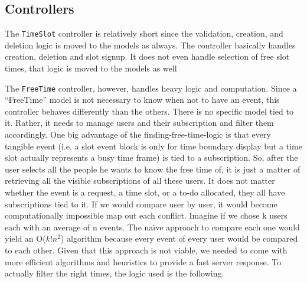 \documentclass[11pt]{article}
\begin{document}
\subsection{Controllers}
The \texttt{TimeSlot} controller is relatively short since the validation, creation, and deletion logic is moved to the models as always. The controller basically handles creation, deletion and slot signup. It does not even handle selection of free slot times, that logic is moved to the models as well

The \texttt{FreeTime} controller, however, handles heavy logic and computation. Since a “FreeTime” model is not necessary to know when not to have an event, this controller behaves differently than the others. There is no specific model tied to it. Rather, it needs to manage users and their subscription and filter them accordingly. One big advantage of the finding-free-time-logic is that every tangible event (i.e. a slot event block is only for time boundary display but a time slot actually represents a busy time frame) is tied to a subscription. So, after the user selects all the people he wants to know the free time of, it is just a matter of retrieving all the visible subscriptions of all these users. It does not matter whether the event is a request, a time slot, or a to-do allocated, they all have subscriptions tied to it.
If we would compare user by user, it would become computationally impossible map out each conflict. Imagine if we chose k users each with an average of n events. The naïve approach to compare each one would yield an O($k!n^2$) algorithm because every event of every user would be compared to each other. Given that this approach is not viable, we needed to come with more efficient algorithms and heuristics to provide a fast server response. To actually filter the right times, the logic used is the following.
\end{document}
